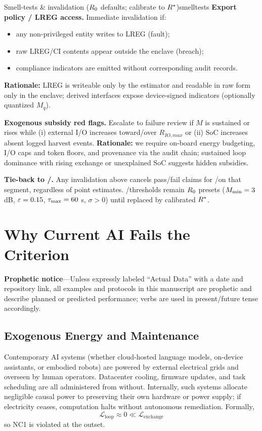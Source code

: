 \documentclass[11pt]{article}
\begin{document}
\begin{docbox}{Smell-tests \& invalidation ($R_0$ defaults; calibrate to $R^*$)}{smelltests}
\textbf{Export policy / LREG access.} Immediate invalidation if:
\begin{itemize}
\item any non-privileged entity writes to LREG (fault);
\item raw LREG/CI contents appear outside the enclave (breach);
\item compliance indicators are emitted without corresponding audit records.
\end{itemize}
\textbf{Rationale:} LREG is writeable only by the estimator and readable in raw form only in the enclave; derived interfaces expose device-signed indicators (optionally quantized $M_q$).

\textbf{Exogenous subsidy red flags.} Escalate to failure review if $M$ is sustained or rises while (i) external I/O increases toward/over $R_{IO,max}$ or (ii) SoC increases absent logged harvest events.
\textbf{Rationale:} we require on-board energy budgeting, I/O caps and token floors, and provenance via the audit chain; sustained loop dominance with rising exchange or unexplained SoC suggests hidden subsidies.

\textbf{Tie-back to \NC/\SC.} Any invalidation above cancels pass/fail claims for \NC/\SC on that segment, regardless of point estimates. \NC/\SC thresholds remain $R_0$ presets ($M_{\min} = 3$ dB, $\varepsilon = 0.15$, $\tau_{\max} = 60$ s, $\sigma > 0$) until replaced by calibrated $R^*$.
\end{docbox}

\section{Why Current AI Fails the Criterion}
\label{sec:ai_fails}

\textbf{Prophetic notice}---Unless expressly labeled ``Actual Data'' with a date and repository link, all examples and protocols in this manuscript are prophetic and describe planned or predicted performance; verbs are used in present/future tense accordingly.

\subsection{Exogenous Energy and Maintenance}

Contemporary AI systems (whether cloud-hosted language models, on-device assistants, or embodied robots) are powered by external electrical grids and overseen by human operators. Datacenter cooling, firmware updates, and task scheduling are all administered from without. Internally, such systems allocate negligible causal power to preserving their own hardware or power supply; if electricity ceases, computation halts without autonomous remediation. Formally,
\begin{equation}
\mathcal{L}_{\text{loop}} \approx 0 \ll \mathcal{L}_{\text{exchange}}
\end{equation}
so NC1 is violated at the outset.
\end{document}

